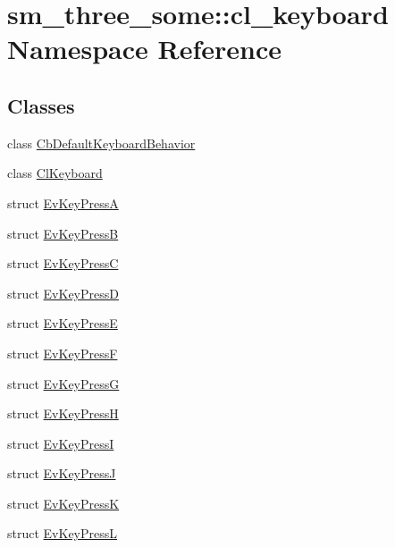 \hypertarget{namespacesm__three__some_1_1cl__keyboard}{}\section{sm\+\_\+three\+\_\+some\+:\+:cl\+\_\+keyboard Namespace Reference}
\label{namespacesm__three__some_1_1cl__keyboard}
\subsection*{Classes}
\begin{DoxyCompactItemize}
\item 
class \hyperlink{classsm__three__some_1_1cl__keyboard_1_1CbDefaultKeyboardBehavior}{Cb\+Default\+Keyboard\+Behavior}
\item 
class \hyperlink{classsm__three__some_1_1cl__keyboard_1_1ClKeyboard}{Cl\+Keyboard}
\item 
struct \hyperlink{structsm__three__some_1_1cl__keyboard_1_1EvKeyPressA}{Ev\+Key\+PressA}
\item 
struct \hyperlink{structsm__three__some_1_1cl__keyboard_1_1EvKeyPressB}{Ev\+Key\+PressB}
\item 
struct \hyperlink{structsm__three__some_1_1cl__keyboard_1_1EvKeyPressC}{Ev\+Key\+PressC}
\item 
struct \hyperlink{structsm__three__some_1_1cl__keyboard_1_1EvKeyPressD}{Ev\+Key\+PressD}
\item 
struct \hyperlink{structsm__three__some_1_1cl__keyboard_1_1EvKeyPressE}{Ev\+Key\+PressE}
\item 
struct \hyperlink{structsm__three__some_1_1cl__keyboard_1_1EvKeyPressF}{Ev\+Key\+PressF}
\item 
struct \hyperlink{structsm__three__some_1_1cl__keyboard_1_1EvKeyPressG}{Ev\+Key\+PressG}
\item 
struct \hyperlink{structsm__three__some_1_1cl__keyboard_1_1EvKeyPressH}{Ev\+Key\+PressH}
\item 
struct \hyperlink{structsm__three__some_1_1cl__keyboard_1_1EvKeyPressI}{Ev\+Key\+PressI}
\item 
struct \hyperlink{structsm__three__some_1_1cl__keyboard_1_1EvKeyPressJ}{Ev\+Key\+PressJ}
\item 
struct \hyperlink{structsm__three__some_1_1cl__keyboard_1_1EvKeyPressK}{Ev\+Key\+PressK}
\item 
struct \hyperlink{structsm__three__some_1_1cl__keyboard_1_1EvKeyPressL}{Ev\+Key\+PressL}

\end{DoxyCompactItemize}
